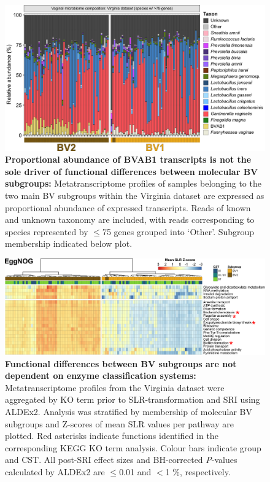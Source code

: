 \documentclass[sn-mathphys,Numbered]{sn-jnl}%
\begin{document}
\begin{figure}[H]
    \centering
    \includegraphics[scale = 0.835]{0_supplFig9_revised.png}
    \caption{\textbf{Proportional abundance of BVAB1 transcripts is not the sole driver of functional differences between molecular BV subgroups:} Metatranscriptome profiles of samples belonging to the two main BV subgroups within the Virginia dataset are expressed as proportional abundance of expressed transcripts. Reads of known and unknown taxonomy are included, with reads corresponding to species represented by $\leq$75 genes grouped into `Other'. Subgroup membership indicated below plot.} \label{fig:sfigVirgBVstackedBars}
\end{figure}
\newpage

\begin{figure}[H]
    \centering
    \includegraphics[scale = 0.81]{0_supplFig10.png}
    \caption{\textbf{Functional differences between BV subgroups are not dependent on enzyme classification systems:} Metatranscriptome profiles from the Virginia dataset were aggregated by KO term prior to SLR-transformation and SRI using ALDEx2. Analysis was stratified by membership of molecular BV subgroups and Z-scores of mean SLR values per pathway are plotted. Red asterisks indicate functions identified in the corresponding KEGG KO term analysis. Colour bars indicate group and CST. All post-SRI effect sizes and BH-corrected \textit{P}-values calculated by ALDEx2 are $\leq$0.01 and $<$1 \%, respectively.} \label{fig:sfigEggNOGvirginia}
\end{figure}
\newpage
\end{document}
